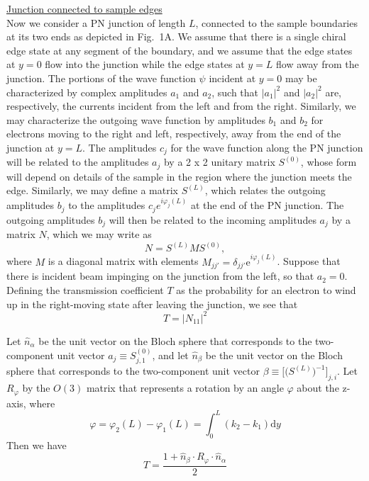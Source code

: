 \documentclass[%
reprint,amsmath,amssymb,aps,prl,superscriptaddress,
twocolumn
]{revtex4-1}
\begin{document}
		\noindent \underline{Junction connected to sample edges}\\
		Now we consider a PN junction of length $L$, connected to the sample boundaries at its two ends as depicted in Fig.~1A. We assume that there is a single chiral edge state at any segment of the boundary, and we assume that the edge states at $y = 0$ flow into the junction while the edge states at $y = L$ flow away from the junction.  The portions of the wave function $\psi$ incident at $y = 0$ may be characterized by complex amplitudes $a_1$ and $a_2$, such that $|a_1|^2$ and $|a_2|^2$ are, respectively, the currents incident from the left and from the right. Similarly, we may characterize the outgoing wave function by amplitudes $b_1$ and $b_2$ for electrons moving to the right and left, respectively, away from the end of the junction at $y = L$.
		The amplitudes $c_j$ for the wave function along the PN junction will be related to the amplitudes $a_j$ by a 2 x 2 unitary matrix $S^{(0)}$, whose form will depend on details of the sample in the region where the junction meets the edge.  Similarly, we may define a matrix $S^{(L)}$, which relates the outgoing amplitudes $b_j$ to the amplitudes $c_j e^{i \varphi_j (L)}$ at the end of the PN junction. The outgoing amplitudes $b_j$ will then be related to the incoming amplitudes $a_j$ by a matrix $N$, which we may write as
		\begin{equation}
		N = S^{(L)} M S^{(0)},
		\end{equation}
		where $M$ is a diagonal matrix with elements $M_{jj'} = \delta_{jj'} \mathrm{e}^{i \varphi_j (L)} $. Suppose that there is incident beam impinging on the junction from the left, so that $a_2 = 0$. Defining the transmission coefficient $T$ as the probability for an electron to wind up in the right-moving state after leaving the junction, we see that 
		\begin{equation}
		T = |N_{11}|^2
		\end{equation}
		
		Let $\hat{n}_\alpha$ be the unit vector on the Bloch sphere that corresponds to the two-component unit vector $ a_j \equiv S^{(0)}_{j,1} $, and let $\hat{n}_\beta$ be the unit vector on the Bloch sphere that corresponds to the two-component unit vector $\beta \equiv \Big[ \Big( S^{(L)} \Big)^{-1} \Big] _{j,i} $. Let $R_{\varphi}$ by the $O(3)$ matrix that represents a rotation by an angle $\varphi$ about the z-axis, where
		\begin{equation}
		\varphi = \varphi_2(L) - \varphi_1(L) = \int_0^L (k_2-k_1) \mathrm{d}y
		\end{equation}
		Then we have
		\begin{equation}
		T = \frac{1+\hat{n}_\beta \cdot R_\varphi \cdot \hat{n}_\alpha}{2}
		\end{equation}
		
\end{document}
